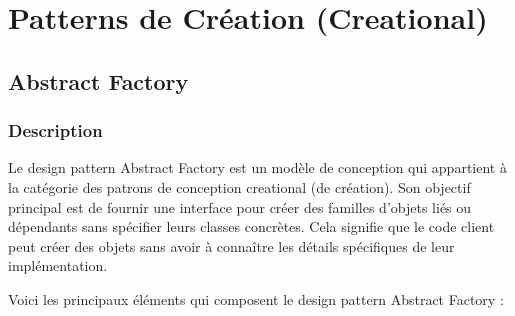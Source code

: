 \section{Patterns de Création (Creational)}


\subsection{Abstract Factory}

\subsubsection{Description}

Le design pattern Abstract Factory est un modèle de conception qui appartient à la catégorie des patrons de conception creational (de création). Son objectif principal est de fournir une interface pour créer des familles d'objets liés ou dépendants sans spécifier leurs classes concrètes. Cela signifie que le code client peut créer des objets sans avoir à connaître les détails spécifiques de leur implémentation.

Voici les principaux éléments qui composent le design pattern Abstract Factory :


